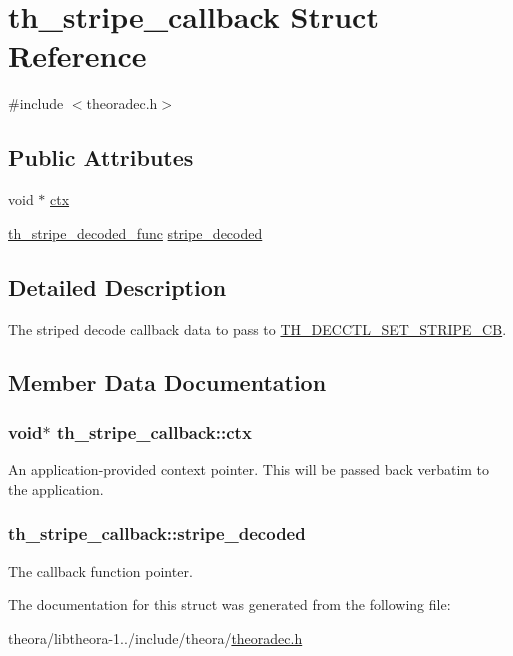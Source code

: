 \hypertarget{structth__stripe__callback}{\section{th\+\_\+stripe\+\_\+callback Struct Reference}
\label{structth__stripe__callback}
}


{\ttfamily \#include $<$theoradec.\+h$>$}

\subsection*{Public Attributes}
\begin{DoxyCompactItemize}
\item 
void $\ast$ \hyperlink{structth__stripe__callback_ab895162ce29a411fa98e0ba9661f47d4}{ctx}
\item 
\hyperlink{theoradec_8h_a25dfc8713157545abd81eda476ca4b54}{th\+\_\+stripe\+\_\+decoded\+\_\+func} \hyperlink{structth__stripe__callback_a977c725680a37e3446e459f063b1f4a5}{stripe\+\_\+decoded}
\end{DoxyCompactItemize}


\subsection{Detailed Description}
The striped decode callback data to pass to \hyperlink{theoradec_8h_ac95cc9e109474b0fa4bb920ab2cfdf1e}{T\+H\+\_\+\+D\+E\+C\+C\+T\+L\+\_\+\+S\+E\+T\+\_\+\+S\+T\+R\+I\+P\+E\+\_\+\+C\+B}. 

\subsection{Member Data Documentation}
\hypertarget{structth__stripe__callback_ab895162ce29a411fa98e0ba9661f47d4}{
\subsubsection[{ctx}]{\setlength{\rightskip}{0pt plus 5cm}void$\ast$ th\+\_\+stripe\+\_\+callback\+::ctx}}\label{structth__stripe__callback_ab895162ce29a411fa98e0ba9661f47d4}
An application-\/provided context pointer. This will be passed back verbatim to the application. \hypertarget{structth__stripe__callback_a977c725680a37e3446e459f063b1f4a5}{
\subsubsection[{stripe\+\_\+decoded}]{ th\+\_\+stripe\+\_\+callback\+::stripe\+\_\+decoded}}\label{structth__stripe__callback_a977c725680a37e3446e459f063b1f4a5}
The callback function pointer. 

The documentation for this struct was generated from the following file\+:\begin{DoxyCompactItemize}
\item 
theora/libtheora-\/1../include/theora/\hyperlink{theoradec_8h}{theoradec.\+h}\end{DoxyCompactItemize}
